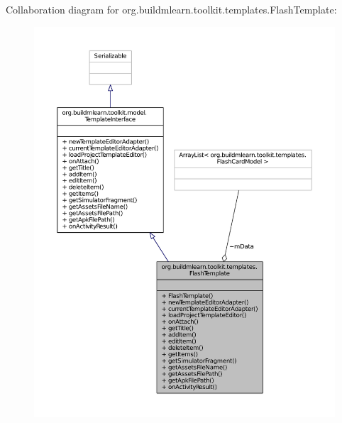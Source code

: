 Collaboration diagram for org.\-buildmlearn.\-toolkit.\-templates.\-Flash\-Template\-:
\nopagebreak
\begin{figure}[H]
\begin{center}
\leavevmode
\includegraphics[width=350pt]{d9/d0b/classorg_1_1buildmlearn_1_1toolkit_1_1templates_1_1FlashTemplate__coll__graph}
\end{center}
\end{figure}
